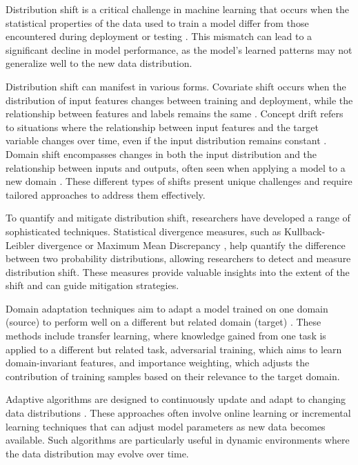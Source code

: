 Distribution shift is a critical challenge in machine learning that occurs when the statistical properties of the data used to train a model differ from those encountered during deployment or testing \cite{quinonero2009dataset, hendrycks2019benchmarking}. This mismatch can lead to a significant decline in model performance, as the model's learned patterns may not generalize well to the new data distribution.

Distribution shift can manifest in various forms. Covariate shift occurs when the distribution of input features changes between training and deployment, while the relationship between features and labels remains the same \cite{shimodaira2000improving}. Concept drift refers to situations where the relationship between input features and the target variable changes over time, even if the input distribution remains constant \cite{gama2014survey}. Domain shift encompasses changes in both the input distribution and the relationship between inputs and outputs, often seen when applying a model to a new domain \cite{patel2015visual}. These different types of shifts present unique challenges and require tailored approaches to address them effectively.

To quantify and mitigate distribution shift, researchers have developed a range of sophisticated techniques. Statistical divergence measures, such as Kullback-Leibler divergence \cite{kullback1951information} or Maximum Mean Discrepancy \cite{gretton2012kernel}, help quantify the difference between two probability distributions, allowing researchers to detect and measure distribution shift. These measures provide valuable insights into the extent of the shift and can guide mitigation strategies.

Domain adaptation techniques aim to adapt a model trained on one domain (source) to perform well on a different but related domain (target) \cite{wang2018deep, sugiyama2007covariate, pan2009survey, ganin2016domain}. These methods include transfer learning, where knowledge gained from one task is applied to a different but related task, adversarial training, which aims to learn domain-invariant features, and importance weighting, which adjusts the contribution of training samples based on their relevance to the target domain.

Adaptive algorithms are designed to continuously update and adapt to changing data distributions \cite{lu2018learning, baena2006early}. These approaches often involve online learning or incremental learning techniques that can adjust model parameters as new data becomes available. Such algorithms are particularly useful in dynamic environments where the data distribution may evolve over time.

